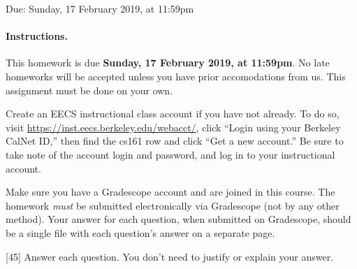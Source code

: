 \documentclass[12pt]{exam}
\newcommand{\checkbox}[3]{%
\iftoggle{pdfform}{%
\CheckBox[name = #1, backgroundcolor=white, bordercolor=black, #2]{}%
}{%
\ifprintanswers\else%
\framebox[0.6cm]{\rule{0pt}{0.4cm}#3}
\fi%
}%
}
\def\duedate{Sunday, 17 February 2019}
\begin{document}
\begin{Form}

\begin{center}
  \large
  Due: \duedate, at 11:59pm
\end{center}

\paragraph{Instructions.}
This homework is due \textbf{\duedate, at 11:59pm}. No late homeworks will be accepted unless you have prior accomodations from us.
This assignment must be done on your own.

Create an EECS instructional class account if you have not already. To do so,
visit \url{https://inst.eecs.berkeley.edu/webacct/}, click ``Login
using your Berkeley CalNet ID,'' then find the cs161 row and click ``Get a new
account.'' Be sure to take note of the account login and password, and log in to
your instructional account.

Make sure you have a Gradescope account and are joined in this course.  The
homework \emph{must} be submitted electronically via Gradescope (not by
any other method).  Your answer for each question,
when submitted on Gradescope, should be a
single file with each question's answer on a separate page.

\begin{questions}

\newpage
{}[45]
Answer each question.
You don't need to justify or explain your answer.

\end{questions}
\end{Form}
\end{document}
